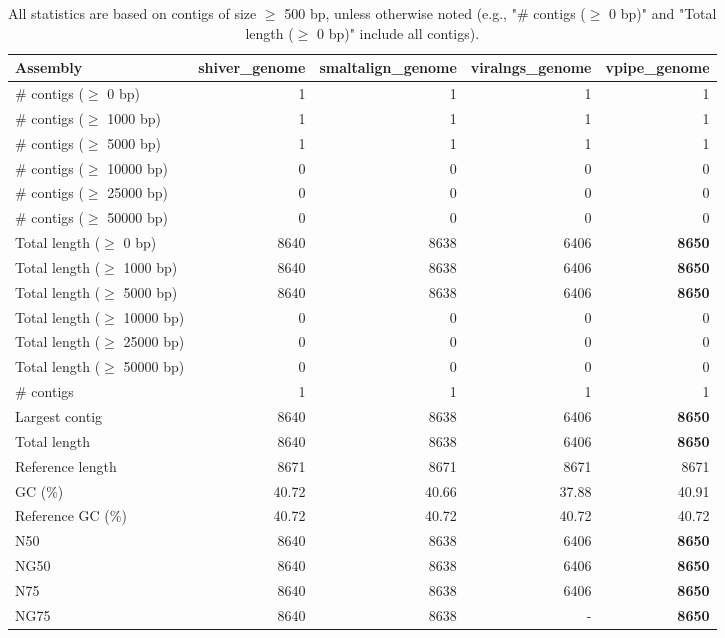 \documentclass[12pt,a4paper]{article}
\begin{document}
\begin{table}[ht]
\begin{center}
\caption{All statistics are based on contigs of size $\geq$ 500 bp, unless otherwise noted (e.g., "\# contigs ($\geq$ 0 bp)" and "Total length ($\geq$ 0 bp)" include all contigs).}
\begin{tabular}{|l*{4}{|r}|}
\hline
Assembly & shiver\_genome & smaltalign\_genome & viralngs\_genome & vpipe\_genome \\ \hline
\# contigs ($\geq$ 0 bp) & 1 & 1 & 1 & 1 \\ \hline
\# contigs ($\geq$ 1000 bp) & 1 & 1 & 1 & 1 \\ \hline
\# contigs ($\geq$ 5000 bp) & 1 & 1 & 1 & 1 \\ \hline
\# contigs ($\geq$ 10000 bp) & 0 & 0 & 0 & 0 \\ \hline
\# contigs ($\geq$ 25000 bp) & 0 & 0 & 0 & 0 \\ \hline
\# contigs ($\geq$ 50000 bp) & 0 & 0 & 0 & 0 \\ \hline
Total length ($\geq$ 0 bp) & 8640 & 8638 & 6406 & {\bf 8650} \\ \hline
Total length ($\geq$ 1000 bp) & 8640 & 8638 & 6406 & {\bf 8650} \\ \hline
Total length ($\geq$ 5000 bp) & 8640 & 8638 & 6406 & {\bf 8650} \\ \hline
Total length ($\geq$ 10000 bp) & 0 & 0 & 0 & 0 \\ \hline
Total length ($\geq$ 25000 bp) & 0 & 0 & 0 & 0 \\ \hline
Total length ($\geq$ 50000 bp) & 0 & 0 & 0 & 0 \\ \hline
\# contigs & 1 & 1 & 1 & 1 \\ \hline
Largest contig & 8640 & 8638 & 6406 & {\bf 8650} \\ \hline
Total length & 8640 & 8638 & 6406 & {\bf 8650} \\ \hline
Reference length & 8671 & 8671 & 8671 & 8671 \\ \hline
GC (\%) & 40.72 & 40.66 & 37.88 & 40.91 \\ \hline
Reference GC (\%) & 40.72 & 40.72 & 40.72 & 40.72 \\ \hline
N50 & 8640 & 8638 & 6406 & {\bf 8650} \\ \hline
NG50 & 8640 & 8638 & 6406 & {\bf 8650} \\ \hline
N75 & 8640 & 8638 & 6406 & {\bf 8650} \\ \hline
NG75 & 8640 & 8638 & - & {\bf 8650} \\ \hline

\end{tabular}
\end{center}
\end{table}
\end{document}
